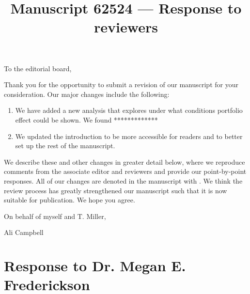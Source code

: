 \documentclass[12pt]{article}
\newcommand{\revise}[1]{{\color{Mahogany}{#1}}}
\begin{document}
\title{Manuscript 62524 --- Response to reviewers}

\maketitle
\noindent To the editorial board,

Thank you for the opportunity to submit a revision of our manuscript for your consideration. Our major changes include the following:
\begin{enumerate}
	\item We have added a new analysis that explores under what conditions portfolio effect could be shown. 
	We found *************
	\item We updated the introduction to be more accessible for readers and to better set up the rest of the manuscript.
\end{enumerate}

We describe these and other changes in greater detail below, where we reproduce comments from the associate editor and reviewers and provide our point-by-point responses. 
All of our changes are denoted in the manuscript with \revise{Mahogany font}.
We think the review process has greatly strengthened our manuscript such that it is now suitable for publication.
We hope you agree. 

\vspace{2em}
\hfill On behalf of myself and T. Miller,

\hfill Ali Campbell
\newpage


\section{Response to Dr. Megan E. Frederickson}
\vspace{-2em}
\end{document}
